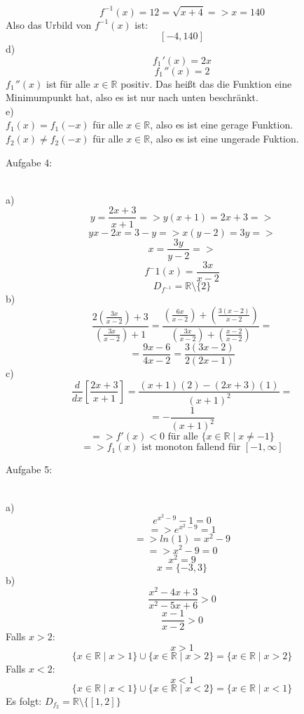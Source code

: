 \documentclass[11pt]{article}
\begin{document}
				$$f^{-1}(x)=12=\sqrt{x+4} => x=140$$
				Also das Urbild von $f^{-1}(x)$ ist:\\
				$$[-4,140]$$
			\indent d)\\
				$$f_1 \hspace{1pt}'(x) = 2x$$
				$$f_1 \hspace{1pt}''(x) = 2$$
				$f_1 \hspace{1pt} ''(x)$ ist für alle $x \in \mathbb{R}$ positiv. Das heißt das die Funktion eine Minimumpunkt hat, also es ist nur nach unten beschränkt.\\
			\indent e)\\
				$f_1(x)=f_1(-x)$ für alle $x\in\mathbb{R}$, also es ist eine gerage Funktion.\\
				$f_2(x) \neq f_2(-x)$ für alle $x\in\mathbb{R}$, also es ist eine ungerade Fuktion.\\
		\noindent \begin{Large}Aufgabe 4:\end{Large}\\[2pt]
			\indent a)
				$$y=\frac{2x+3}{x+1} => y(x+1)=2x+3=>$$
				$$yx-2x=3-y => x(y-2)=3y=>$$
				$$x=\frac{3y}{y-2}=>$$
				$$f^-1(x)=\frac{3x}{x-2}$$
				$$D_{f^{-1}}=\mathbb{R}\setminus\{2\}$$
			\indent b)
				$$\frac{2\left(\frac{3x}{x-2}\right)+3}{\left(\frac{3x}{x-2}\right)+1}=\frac{\left(\frac{6x}{x-2}\right)+\left(\frac{3(x-2)}{x-2}\right)}{\left(\frac{3x}{x-2}\right)+\left(\frac{x-2}{x-2}\right)}=$$
				$$=\frac{9x-6}{4x-2}=\frac{3(3x-2)}{2(2x-1)}$$
			\indent c)
				$$\frac{d}{dx}\left[\frac{2x+3}{x+1}\right]=\frac{(x+1)(2)-(2x+3)(1)}{(x+1)^2}=$$
				$$=-\frac{1}{(x+1)^2}$$
				$$=> f'(x)<0  \mbox{ für alle } \{x \in \mathbb{R} \mid x \neq -1\}$$
				$$=> f_1(x) \mbox{ ist monoton fallend  für }[-1,\infty] $$		
		\noindent \begin{Large}Aufgabe 5:\end{Large}\\[2pt]
			\indent a)
				$$e^{x^2-9}-1=0$$
				$$=> e^{x^2-9}=1$$
				$$=>ln(1)=x^2-9$$
				$$=>x^2-9=0$$
				$$x^2=9$$
				$$x=\{-3,3\}$$
			\indent b)
						$$\frac{x^2-4x+3}{x^2-5x+6}>0$$
						$$\frac{x-1}{x-2}>0$$
					Falls $x>2$:
						$$x>1$$
						$$\{x \in \mathbb{R} \mid x>1\} \cup \{x \in \mathbb{R} \mid x>2\} = \{x \in \mathbb{R} \mid x>2 \}$$
					Falls $x<2$:
						$$x<1$$
						$$\{x \in \mathbb{R} \mid x<1\} \cup \{x \in \mathbb{R} \mid x<2\} = \{x \in \mathbb{R} \mid x<1 \}$$
					Es folgt: $D_{f_2} = \mathbb{R}\setminus\{[1,2]\}$
\end{document}
